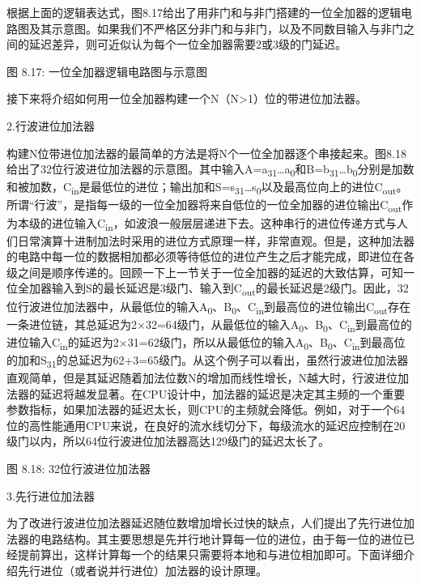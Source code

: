 \documentclass[]{ctexbook}
\begin{document}
根据上面的逻辑表达式，图8.17给出了用非门和与非门搭建的一位全加器的逻辑电路图及其示意图。如果我们不严格区分非门和与非门，以及不同数目输入与非门之间的延迟差异，则可近似认为每个一位全加器需要2或3级的门延迟。

图 8.17: 一位全加器逻辑电路图与示意图

接下来将介绍如何用一位全加器构建一个N（N\textgreater1）位的带进位加法器。

2.行波进位加法器

构建N位带进位加法器的最简单的方法是将N个一位全加器逐个串接起来。图8.18给出了32位行波进位加法器的示意图。其中输入A=a\textsubscript{31}\ldots a\textsubscript{0}和B=b\textsubscript{31}\ldots b\textsubscript{0}分别是加数和被加数，C\textsubscript{in}是最低位的进位；输出加和S=s\textsubscript{31}\ldots s\textsubscript{0}以及最高位向上的进位C\textsubscript{out}。所谓``行波''，是指每一级的一位全加器将来自低位的一位全加器的进位输出C\textsubscript{out}作为本级的进位输入C\textsubscript{in}，如波浪一般层层递进下去。这种串行的进位传递方式与人们日常演算十进制加法时采用的进位方式原理一样，非常直观。但是，这种加法器的电路中每一位的数据相加都必须等待低位的进位产生之后才能完成，即进位在各级之间是顺序传递的。回顾一下上一节关于一位全加器的延迟的大致估算，可知一位全加器输入到S的最长延迟是3级门、输入到C\textsubscript{out}的最长延迟是2级门。因此，32位行波进位加法器中，从最低位的输入A\textsubscript{0}、B\textsubscript{0}、C\textsubscript{in}到最高位的进位输出C\textsubscript{out}存在一条进位链，其总延迟为2×32=64级门，从最低位的输入A\textsubscript{0}、B\textsubscript{0}、C\textsubscript{in}到最高位的进位输入C\textsubscript{in}的延迟为2×31=62级门，所以从最低位的输入A\textsubscript{0}、B\textsubscript{0}、C\textsubscript{in}到最高位的加和S\textsubscript{31}的总延迟为62+3=65级门。从这个例子可以看出，虽然行波进位加法器直观简单，但是其延迟随着加法位数N的增加而线性增长，N越大时，行波进位加法器的延迟将越发显著。在CPU设计中，加法器的延迟是决定其主频的一个重要参数指标，如果加法器的延迟太长，则CPU的主频就会降低。例如，对于一个64位的高性能通用CPU来说，在良好的流水线切分下，每级流水的延迟应控制在20级门以内，所以64位行波进位加法器高达129级门的延迟太长了。

图 8.18: 32位行波进位加法器

3.先行进位加法器

为了改进行波进位加法器延迟随位数增加增长过快的缺点，人们提出了先行进位加法器的电路结构。其主要思想是先并行地计算每一位的进位，由于每一位的进位已经提前算出，这样计算每一个的结果只需要将本地和与进位相加即可。下面详细介绍先行进位（或者说并行进位）加法器的设计原理。
\end{document}
